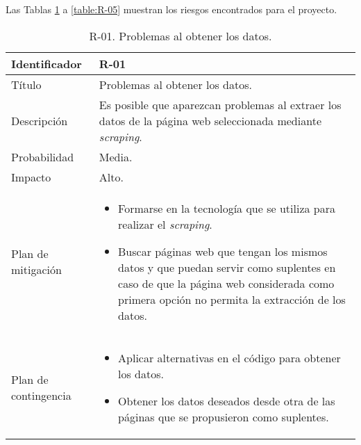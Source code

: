  \renewcommand\tabularxcolumn[1]{m{#1}}
 Las Tablas \ref{table:R-01} a \ref{table:R-05} muestran los riesgos encontrados para el proyecto. 

 \begin{table}[H]
  \centering
\begin{tabularx}{1\textwidth} { 
  | >{\centering\arraybackslash}X 
  | >{\centering\arraybackslash}X 
  |  }
 \hline
 Identificador & R-01 \\
 \hline
 Título & Problemas al obtener los datos. \\
 \hline
 Descripción  & Es posible que aparezcan problemas al extraer los datos de la página web seleccionada mediante \textit{scraping}.  \\
\hline
 Probabilidad  & Media.  \\
 \hline
 Impacto  & Alto.   \\
 \hline
 Plan de mitigación  & \begin{itemize}
     \item Formarse en la tecnología que se utiliza para realizar el \textit{scraping}.
      \item Buscar páginas web que tengan los mismos datos y que puedan servir como suplentes en caso de que la página web considerada como primera opción no permita la extracción de los datos.
 \end{itemize}   \\
 

  \hline

  Plan de contingencia  & \begin{itemize}
     \item Aplicar alternativas en el código para obtener los datos.
     \item Obtener los datos deseados desde otra de las páginas que se propusieron como suplentes.
      
 \end{itemize}   \\
 

  \hline
\end{tabularx}
\caption{R-01. Problemas al obtener los datos.}
\label{table:R-01}
\end{table}






